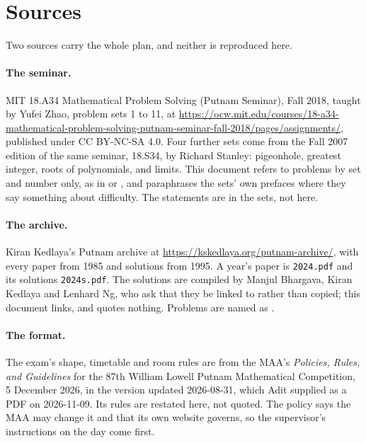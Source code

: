 \section{Sources}

Two sources carry the whole plan, and neither is reproduced here.

\begin{sloppypar}
\paragraph{The seminar.} MIT 18.A34 Mathematical Problem Solving (Putnam Seminar), Fall 2018, taught by Yufei Zhao, problem sets 1 to 11, at \url{https://ocw.mit.edu/courses/18-a34-mathematical-problem-solving-putnam-seminar-fall-2018/pages/assignments/}, published under CC BY-NC-SA 4.0. Four further sets come from the Fall 2007 edition of the same seminar, 18.S34, by Richard Stanley: pigeonhole, greatest integer, roots of polynomials, and limits. This document refers to problems by set and number only, as in  or , and paraphrases the sets' own prefaces where they say something about difficulty. The statements are in the sets, not here.

\paragraph{The archive.} Kiran Kedlaya's Putnam archive at \url{https://kskedlaya.org/putnam-archive/}, with every paper from 1985 and solutions from 1995. A year's paper is \texttt{2024.pdf} and its solutions \texttt{2024s.pdf}. The solutions are compiled by Manjul Bhargava, Kiran Kedlaya and Lenhard Ng, who ask that they be linked to rather than copied; this document links, and quotes nothing. Problems are named as .
\end{sloppypar}

\paragraph{The format.} The exam's shape, timetable and room rules are from the MAA's \emph{Policies, Rules, and Guidelines} for the 87th William Lowell Putnam Mathematical Competition, 5 December 2026, in the version updated 2026-08-31, which Adit supplied as a PDF on 2026-11-09. Its rules are restated here, not quoted. The policy says the MAA may change it and that its own website governs, so the supervisor's instructions on the day come first.

